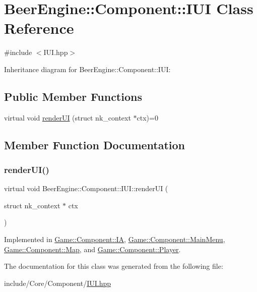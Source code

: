 \hypertarget{class_beer_engine_1_1_component_1_1_i_u_i}{}\section{Beer\+Engine\+:\+:Component\+:\+:I\+UI Class Reference}
\label{class_beer_engine_1_1_component_1_1_i_u_i}


{\ttfamily \#include $<$I\+U\+I.\+hpp$>$}



Inheritance diagram for Beer\+Engine\+:\+:Component\+:\+:I\+UI\+:
\subsection*{Public Member Functions}
\begin{DoxyCompactItemize}
\item 
virtual void \mbox{\hyperlink{class_beer_engine_1_1_component_1_1_i_u_i_a4a049b1749c1bce80e1fd63538e9fae3}{render\+UI}} (struct nk\+\_\+context $\ast$ctx)=0
\end{DoxyCompactItemize}


\subsection{Member Function Documentation}
\mbox{\label{class_beer_engine_1_1_component_1_1_i_u_i_a4a049b1749c1bce80e1fd63538e9fae3}} 
\subsubsection{\texorpdfstring{render\+U\+I()}{renderUI()}}
{\footnotesize\ttfamily virtual void Beer\+Engine\+::\+Component\+::\+I\+U\+I\+::render\+UI (\begin{DoxyParamCaption}\item[{struct nk\+\_\+context $\ast$}]{ctx }\end{DoxyParamCaption})\hspace{0.3cm}{\ttfamily [pure virtual]}}



Implemented in \mbox{\hyperlink{class_game_1_1_component_1_1_i_a_a50991daa660054341c1f339611226c02}{Game\+::\+Component\+::\+IA}}, \mbox{\hyperlink{class_game_1_1_component_1_1_main_menu_a36f876bbeca9056e17c6d13b82fc3364}{Game\+::\+Component\+::\+Main\+Menu}}, \mbox{\hyperlink{class_game_1_1_component_1_1_map_af062dd2c3e677c1d3d9204cac8508dde}{Game\+::\+Component\+::\+Map}}, and \mbox{\hyperlink{class_game_1_1_component_1_1_player_a5d5f837406a8e9f62dbe2c83ab3751b6}{Game\+::\+Component\+::\+Player}}.



The documentation for this class was generated from the following file\+:\begin{DoxyCompactItemize}
\item 
include/\+Core/\+Component/\mbox{\hyperlink{_i_u_i_8hpp}{I\+U\+I.\+hpp}}\end{DoxyCompactItemize}
